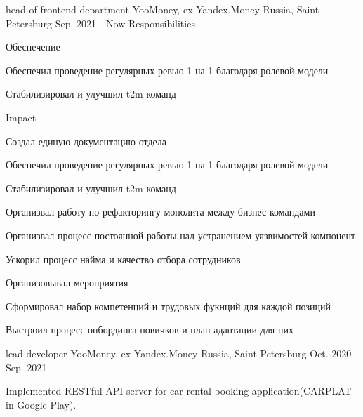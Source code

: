 
\begin{cventries}

  \cvmultientry
    {head of frontend department} %
    {YooMoney, ex Yandex.Money} %
    {Russia, Saint-Petersburg} %
    {Sep. 2021 - Now} %
    {Responsibilities}
    {
      \begin{cvitems}
        \item {Обеспечение }
        \item {Обеспечил проведение регулярных ревью 1 на 1 благодаря ролевой модели}
        \item {Стабилизировал и улучшил t2m команд}
      \end{cvitems}
    }
    {Impact}
    {
      \begin{cvitems} %
        \item {Создал единую документацию отдела}
        \item {Обеспечил проведение регулярных ревью 1 на 1 благодаря ролевой модели}
        \item {Стабилизировал и улучшил t2m команд}
        \item {Организвал работу по рефакторингу монолита между бизнес командами}
        \item {Организвал процесс постоянной работы над устранением уязвимостей компонент}
        \item {Ускорил процесс найма и качество отбора сотрудников}
        \item {Организовывал мероприятия}
        \item {Сформировал набор компетенций и трудовых фукнций для каждой позиций}
        \item {Выстроил процесс онбординга новичков и план адаптации для них}
      \end{cvitems}
    }

  \cventry
    {lead developer} %
    {YooMoney, ex Yandex.Money} %
    {Russia, Saint-Petersburg} %
    {Oct. 2020 - Sep. 2021} %
    {
      \begin{cvitems} %
        \item {Implemented RESTful API server for car rental booking application(CARPLAT in Google Play).}
      \end{cvitems}
    }


\end{cventries}
